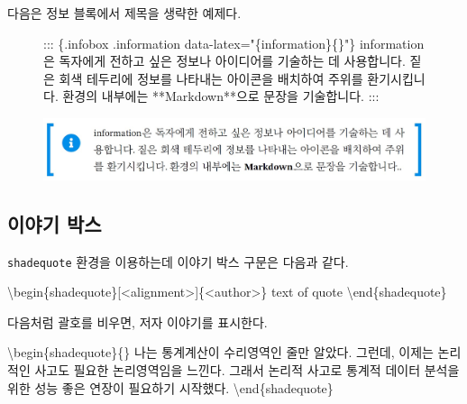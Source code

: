 \documentclass[
  letterpaper,
]{book}
\newenvironment{Shaded}{\begin{snugshade}}{\end{snugshade}}
\newcommand{\ExtensionTok}[1]{\textcolor[rgb]{0.00,0.23,0.31}{#1}}
\newcommand{\KeywordTok}[1]{\textcolor[rgb]{0.00,0.23,0.31}{#1}}
\newcommand{\NormalTok}[1]{\textcolor[rgb]{0.00,0.23,0.31}{#1}}
\begin{document}
다음은 정보 블록에서 제목을 생략한 예제다.

\begin{figure}

\begin{Shaded}
\begin{Highlighting}[]
\NormalTok{::: \{.infobox .information data{-}latex="\{information\}\{\}"\}}
\NormalTok{information은 독자에게 전하고 싶은 정보나 아이디어를 기술하는 데 사용합니다.}
\NormalTok{짙은 회색 테두리에 정보를 나타내는 아이콘을 배치하여 주위를 환기시킵니다.}
\NormalTok{환경의 내부에는 **Markdown**으로 문장을 기술합니다.}
\NormalTok{:::}
\end{Highlighting}
\end{Shaded}

\includegraphics{images/infobox_01_notitle.jpg}

\end{figure}

\hypertarget{uxc774uxc57cuxae30-uxbc15uxc2a4}{%
\subsection{이야기 박스}\label{uxc774uxc57cuxae30-uxbc15uxc2a4}}

\texttt{shadequote} 환경을 이용하는데 이야기 박스 구문은 다음과 같다.

\begin{Shaded}
\begin{Highlighting}[]
\KeywordTok{\textbackslash{}begin}\NormalTok{\{}\ExtensionTok{shadequote}\NormalTok{\}[\textless{}alignment\textgreater{}]\{\textless{}author\textgreater{}\}}
\NormalTok{  text of quote}
\KeywordTok{\textbackslash{}end}\NormalTok{\{}\ExtensionTok{shadequote}\NormalTok{\}}
\end{Highlighting}
\end{Shaded}

다음처럼 괄호를 비우면, 저자 이야기를 표시한다.

\begin{Shaded}
\begin{Highlighting}[]
\KeywordTok{\textbackslash{}begin}\NormalTok{\{}\ExtensionTok{shadequote}\NormalTok{\}\{\}}
\NormalTok{나는 통계계산이 수리영역인 줄만 알았다. 그런데, 이제는 논리적인 사고도 필요한}
\NormalTok{논리영역임을 느낀다. 그래서 논리적 사고로 통계적 데이터 분석을 위한 성능 좋은}
\NormalTok{연장이 필요하기 시작했다.}
\KeywordTok{\textbackslash{}end}\NormalTok{\{}\ExtensionTok{shadequote}\NormalTok{\}}
\end{Highlighting}
\end{Shaded}
\end{document}
